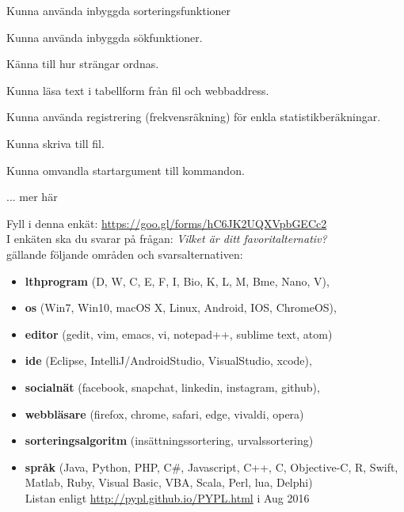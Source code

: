 

\Lab{\LabWeekTEN}

\begin{Goals}
\item Kunna använda inbyggda sorteringsfunktioner
\item Kunna använda inbyggda sökfunktioner.
\item Känna till hur strängar ordnas.
\item Kunna läsa text i tabellform från fil och webbaddress.
\item Kunna använda registrering (frekvensräkning) för enkla statistikberäkningar.
\item Kunna skriva till fil.
\item Kunna omvandla startargument till kommandon.
\item ... \TODO mer här
\end{Goals}

\begin{Preparations}
\item {}
\item {}
\item \ReadTheLab
\item Fyll i denna enkät: \url{https://goo.gl/forms/hC6JK2UQXVpbGECc2}  \\
I enkäten ska du svarar på frågan: \textit{Vilket är ditt favoritalternativ?} \\
gällande följande områden och svarsalternativen:
\begin{itemize}[nolistsep,noitemsep]
\item \textbf{lthprogram} (D, W, C, E, F, I, Bio, K, L, M, Bme, Nano, V), 
\item \textbf{os} (Win7, Win10, macOS X, Linux, Android, IOS, ChromeOS), 
\item \textbf{editor} (gedit, vim, emacs, vi, notepad++, sublime text, atom)
\item \textbf{ide} (Eclipse, IntelliJ/AndroidStudio, VisualStudio, xcode), 
\item \textbf{socialnät} (facebook, snapchat, linkedin, instagram, github), 
\item \textbf{webbläsare} (firefox, chrome, safari, edge, vivaldi, opera)
\item \textbf{sorteringsalgoritm} (insättningssortering, urvalssortering)
\item \textbf{språk} (Java, Python, PHP, C\#, Javascript, C++, C, Objective-C, R, Swift, Matlab, Ruby, Visual Basic, VBA, Scala, Perl, lua, Delphi)  \\
Listan enligt \url{http://pypl.github.io/PYPL.html} i Aug 2016
\end{itemize}
\end{Preparations}


